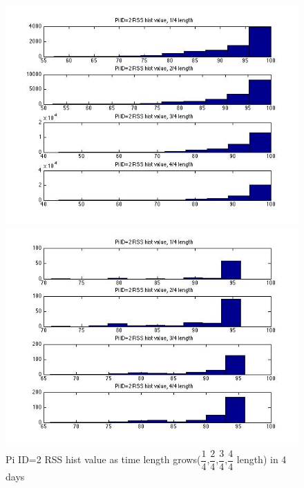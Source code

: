 \documentclass[10pt,conference]{IEEEtran}
\begin{document}
\begin{figure}[htbp]
\begin{minipage}[t]{0.2\textwidth}
	\includegraphics[scale=0.2]{time1-3}
\end{minipage}
\begin{minipage}[t]{0.2\textwidth}
	\centering
	\includegraphics[scale=0.2]{time1-4}
\end{minipage}
\caption{Pi ID=2 RSS hist value as time length grows($\dfrac{1}{4}$,$\dfrac{2}{4}$,$\dfrac{3}{4}$,$\dfrac{4}{4}$ length) in 4 days}\label{hist2}
\end{figure}
\end{document}
